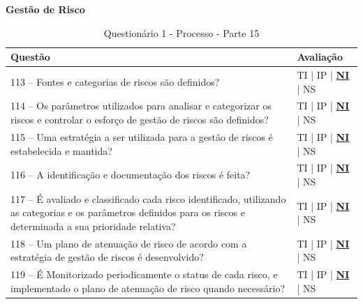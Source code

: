 \documentclass[openany,10pt,a4paper]{article}
\begin{document}
\begin{appendix}
	\begin{table}[H]
	\textbf{Gestão de Risco}
		\centering
		\caption{Questionário 1 - Processo - Parte 15}
		\begin{tabular}{|p{5in}p{1in}|}		
			\hline
			\textbf{Questão}  & \textbf{Avaliação}\\ 
			\hline
			113 – Fontes e categorias de riscos são definidos?
	 & TI | IP | \underline{\textbf{NI}} | NS \\
			\hline
			114 – Os parâmetros utilizados para analisar e categorizar os riscos e controlar o esforço de 
	gestão de riscos são definidos?
	 & TI | IP | \underline{\textbf{NI}} | NS \\
			\hline
			115 – Uma estratégia a ser utilizada para a gestão de riscos é estabelecida e mantida?
	 & TI | IP | \underline{\textbf{NI}} | NS \\
			\hline
			116 – A identificação e documentação dos riscos é feita?
	 & TI | IP | \underline{\textbf{NI}} | NS \\
			\hline
		117 – É avaliado e classificado cada risco identificado, utilizando as categorias e os parâmetros 
	definidos para os riscos e determinada a sua prioridade relativa?
	  & TI | IP | \underline{\textbf{NI}} | NS \\
			\hline
			118 – Um plano de atenuação de risco de acordo com a estratégia de gestão de riscos é 
	desenvolvido?
	 & TI | IP | \underline{\textbf{NI}} | NS \\
	 \hline
			119 – É Monitorizado periodicamente o status de cada risco, e implementado o plano de 
	atenuação de risco quando necessário?
	 & TI | IP | \underline{\textbf{NI}} | NS \\
			\hline
		\end{tabular} 
	\end{table}
	

\end{appendix}
\end{document}

